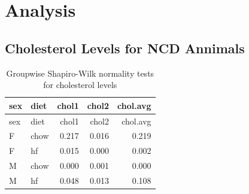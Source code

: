 \documentclass[
]{article}
\newenvironment{Shaded}{\begin{snugshade}}{\end{snugshade}}
\newcommand{\AttributeTok}[1]{\textcolor[rgb]{0.77,0.63,0.00}{#1}}
\newcommand{\FunctionTok}[1]{\textcolor[rgb]{0.00,0.00,0.00}{#1}}
\newcommand{\NormalTok}[1]{#1}
\newcommand{\SpecialCharTok}[1]{\textcolor[rgb]{0.00,0.00,0.00}{#1}}
\newcommand{\StringTok}[1]{\textcolor[rgb]{0.31,0.60,0.02}{#1}}
\begin{document}
\hypertarget{analysis}{%
\section{Analysis}\label{analysis}}

\hypertarget{cholesterol-levels-for-ncd-annimals}{%
\subsection{Cholesterol Levels for NCD
Annimals}\label{cholesterol-levels-for-ncd-annimals}}

\begin{Shaded}
\end{Shaded}

\begin{longtable}[]{@{}llrrr@{}}
\caption{Groupwise Shapiro-Wilk normality tests for cholesterol
levels}\tabularnewline
\toprule()
sex & diet & chol1 & chol2 & chol.avg \\
\midrule()
\endfirsthead
\toprule()
sex & diet & chol1 & chol2 & chol.avg \\
\midrule()
\endhead
F & chow & 0.217 & 0.016 & 0.219 \\
F & hf & 0.015 & 0.000 & 0.002 \\
M & chow & 0.000 & 0.001 & 0.000 \\
M & hf & 0.048 & 0.013 & 0.108 \\
\bottomrule()
\end{longtable}
\end{document}
